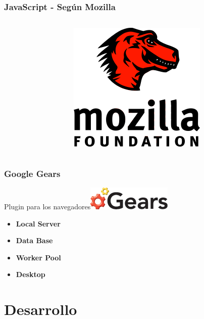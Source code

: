 \documentclass{beamer}
\begin{document}
\begin{frame}

    \frametitle{JavaScript - Según Mozilla}
    \begin{columns}[c]
         \begin{column}{5cm}
         \end{column}
         \begin{column}{5cm}
            \includegraphics[scale=1.2]{mozilla.png}
            
    
         \end{column}
     \end{columns}    
\end{frame}

\begin{frame}
    \frametitle{Google Gears}
    \par{
        Plugin para los navegadores\hfill\includegraphics[scale=0.3]{gears.png}
    }
    \begin{itemize}
        \item{\bf Local Server}
        \item{\bf Data Base}
        \item{\bf Worker Pool}
        \item{\bf Desktop}
    \end{itemize}
\end{frame}

\section{Desarrollo}
\end{document}
